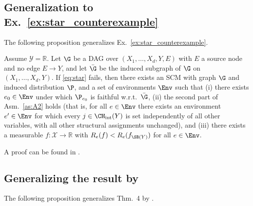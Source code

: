 \subsection{Generalization to Ex.~\ref{ex:star_counterexample}} \label{sec:generalized_example}
The following proposition generalizes
Ex.~\ref{ex:star_counterexample}.
\begin{proposition} \label{prop:star_necessary}
Assume $\mathcal{Y} = \mathbb{R}$. Let $\G$ be a DAG over $(X_1, \ldots, X_d, Y, E)$ with $E$ a source node and no edge $E \to Y$, and let $\bar{\G}$ be the induced subgraph of $\G$ on $(X_1, \ldots, X_d, Y)$. If \eqref{eq:star} fails, then there exists an SCM with graph $\G$ and induced distribution $\P$, and a set of environments $\Env$
such that
(i) there exists $e_0 \in \Env$ under which $\P_{e_0}$ is faithful w.r.t.\ $\bar{\G}$,
(ii) the second part of Asm.~\ref{as:A2} holds (that is, for all $e \in \Env$ there exists an environment $e' \in \Env$ for which every $j \in \CH_\mathrm{int}(Y)$ is set independently of all other variables, with all other structural assignments unchanged), and
(iii) there exists a measurable $f \colon \mathcal{X} \to \mathbb{R}$ with $R_e(f) < R_e(f_{\SB(Y)})$ for all $e \in \Env$.
\end{proposition}

A proof can be found in .


\subsection[Generalizing the result by Rojas-Carulla et al. (2018)]{Generalizing the result by \citet{rojas-carullaInvariantModelsCausal2018}}
\label{app:rojas}

The following proposition generalizes Thm.~4 by \citet{rojas-carullaInvariantModelsCausal2018}.


